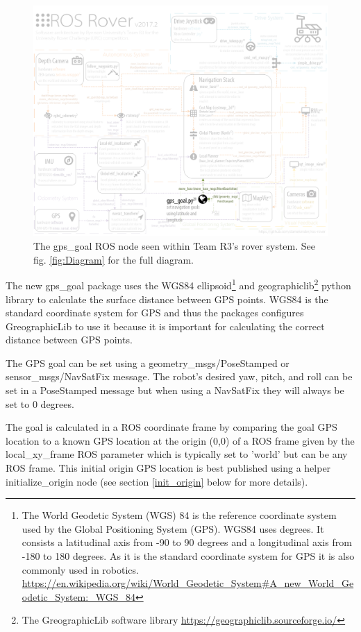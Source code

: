 \documentclass[runningheads,a4paper]{llncs}
\begin{document}
\begin{figure}
\centering
\includegraphics[width=\textwidth]{GPS_goal_Diagram2}
\caption{The gps\_goal ROS node seen within Team R3's rover system. See fig. \ref{fig:Diagram} for the full diagram.}
\label{fig:GPS_goal_Diagram2}
\end{figure}


The new gps\_goal package uses the WGS84 ellipsoid\footnote{The World Geodetic System (WGS) 84 is the reference coordinate system used by the Global Positioning System (GPS). WGS84 uses degrees. It consists a latitudinal axis from -90 to 90 degrees and a longitudinal axis from -180 to 180 degrees. As it is the standard coordinate system for GPS it is also commonly used in robotics. \url{https://en.wikipedia.org/wiki/World_Geodetic_System#A_new_World_Geodetic_System:_WGS_84}} and geographiclib\footnote{The GreographicLib software library \url{https://geographiclib.sourceforge.io/}} python library to calculate the surface distance between GPS points. WGS84 is the standard coordinate system for GPS and thus the packages configures GreographicLib to use it because it is important for calculating the correct distance between GPS points.

The GPS goal can be set using a geometry\_msgs/PoseStamped or sensor\_msgs/NavSatFix message. The robot's desired yaw, pitch, and roll can be set in a PoseStamped message but when using a NavSatFix they will always be set to 0 degrees.

The goal is calculated in a ROS coordinate frame by comparing the goal GPS location to a known GPS location at the origin (0,0) of a ROS frame given by the local\_xy\_frame ROS parameter which is typically set to 'world' but can be any ROS frame. This initial origin GPS location is best published using a helper initialize\_origin node (see section \ref{init_origin} below for more details).
\end{document}
